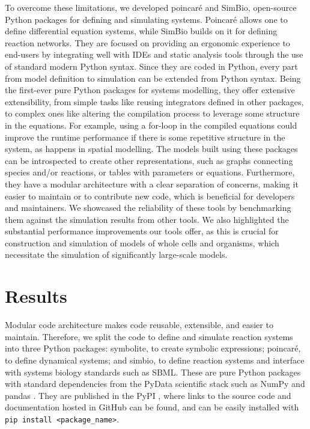 \documentclass[
  letterpaper,
  DIV=11,
  numbers=noendperiod]{scrartcl}
\begin{document}
To overcome these limitations, we developed poincaré and SimBio,
open-source Python packages for defining and simulating systems.
Poincaré allows one to define differential equation systems, while SimBio
builds on it for defining reaction networks. They are focused on
providing an ergonomic experience to end-users by integrating well with
\acp{IDE} and static analysis tools through the use of standard modern Python
syntax. Since they are coded in Python, every part from model definition
to simulation can be extended from Python syntax. Being the first-ever
pure Python packages for systems modelling, they offer extensive
extensibility, from simple tasks like reusing integrators defined in
other packages, to complex ones like altering the compilation process to
leverage some structure in the equations. For example, using a for-loop
in the compiled equations could improve the runtime performance if there
is some repetitive structure in the system, as happens in spatial
modelling. The models built using these packages can be introspected to
create other representations, such as graphs connecting species and/or
reactions, or tables with parameters or equations. Furthermore, they
have a modular architecture with a clear separation of concerns, making
it easier to maintain or to contribute new code, which is beneficial for
developers and maintainers. We showcased the reliability of these tools
by benchmarking them against the simulation results from other tools. We
also highlighted the substantial performance improvements our tools
offer, as this is crucial for construction and simulation of models of
whole cells and organisms, which necessitate the simulation of
significantly large-scale models.

\hypertarget{results}{%
\section{Results}\label{results}}



Modular code architecture makes code reusable, extensible, and easier to
maintain. Therefore, we split the code to define and simulate reaction
systems into three Python packages: symbolite, to create symbolic
expressions; poincaré, to define dynamical systems; and simbio, to
define reaction systems and interface with systems biology standards
such as \ac{SBML}. These are pure Python packages with standard dependencies
from the PyData scientific stack such as NumPy \cite{harrisArrayProgrammingNumPy2020}
and pandas \cite{mckinneyDataStructuresStatistical2010}. They are published in the \acf{PyPI}
, where links to the source code and documentation hosted
in GitHub can be found, and can be easily installed with
\texttt{pip\ install\ \textless{}package\_name\textgreater{}}.
\end{document}
